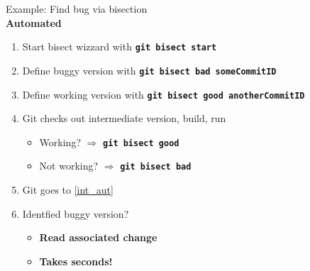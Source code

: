 \begin{frame}[fragile]
\emptyframetitle

Example: Find bug via bisection\\[7pt]

\textbf{Automated}
\begin{enumerate}
  \item Start bisect wizzard with \textbf{\texttt{git bisect start}}
  \item Define buggy version with \textbf{\texttt{git bisect bad someCommitID}}
  \item Define working version with \textbf{\texttt{git bisect good anotherCommitID}}
  \item Git checks out intermediate version, build, run\label{int_aut}
  \begin{itemize}
    \normalsize
    \item Working? $\Rightarrow$ \textbf{\texttt{git bisect good}}
    \item Not working? $\Rightarrow$ \textbf{\texttt{git bisect bad}}
  \end{itemize}
  \item Git goes to \ref{int_aut}
  \item Identfied buggy version?
  \begin{itemize}
    \normalsize
    \item \textbf{Read associated change}
    \item \textbf{Takes seconds!}
  \end{itemize}
\end{enumerate}


\end{frame}

